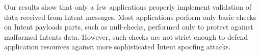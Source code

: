 

Our results show that only a few applications properly implement validation of data received from Intent messages. Most applications perform only basic checks on Intent payloads parts, such as null-checks, performed only to protect against malformed Intents data. However, such checks are not strict enough to defend application resources against more sophisticated Intent spoofing attacks.



